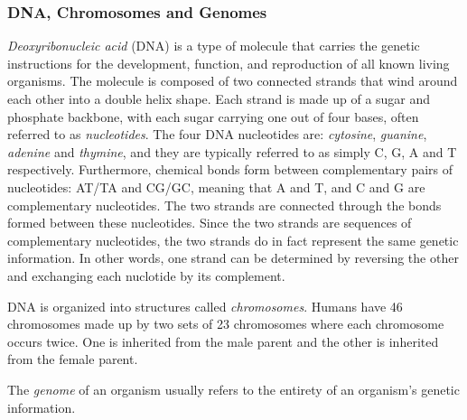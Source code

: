 \subsubsection{DNA, Chromosomes and Genomes} \label{background:biology:dna_and_chromosomes}
\textit{Deoxyribonucleic acid} (DNA) is a type of molecule that carries the genetic instructions for the development, function, and reproduction of all known living organisms.
The molecule is composed of two connected strands that wind around each other into a double helix shape.
Each strand is made up of a sugar and phosphate backbone, with each sugar carrying one out of four bases, often referred to as \textit{nucleotides}. 
The four DNA nucleotides are: \textit{cytosine}, \textit{guanine}, \textit{adenine} and \textit{thymine}, and they are typically referred to as simply C, G, A and T respectively.
Furthermore, chemical bonds form between complementary pairs of nucleotides: AT/TA and CG/GC, meaning that A and T, and C and G are complementary nucleotides. 
The two strands are connected through the bonds formed between these nucleotides.
Since the two strands are sequences of complementary nucleotides, the two strands do in fact represent the same genetic information. 
In other words, one strand can be determined by reversing the other and exchanging each nuclotide by its complement.

DNA is organized into structures called \textit{chromosomes}. 
Humans have 46 chromosomes made up by two sets of 23 chromosomes where each chromosome occurs twice. One is inherited from the male parent and the other is inherited from the female parent.

The \textit{genome} of an organism usually refers to the entirety of an organism's genetic information. 

